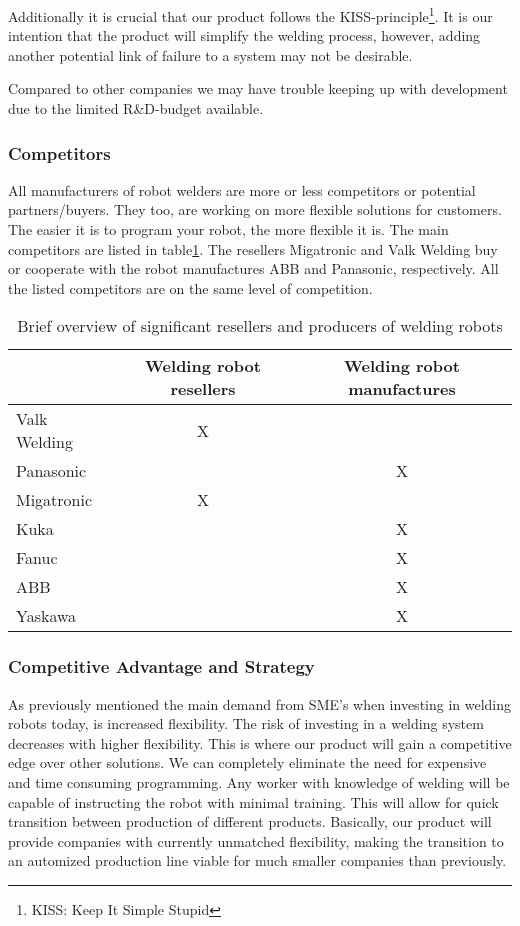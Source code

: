 Additionally it is crucial that our product follows the KISS-principle\footnote{KISS: Keep It Simple Stupid}. It is our intention that the product will simplify the welding process, however, adding another potential link of failure to a system may not be desirable.

Compared to other companies we may have trouble keeping up with development due to the limited R\&D-budget available.
\subsubsection{Competitors}
\label{competitors}
All manufacturers of robot welders are more or less competitors or potential partners/buyers. They too, are working on more flexible solutions for customers. The easier it is to program your robot, the more flexible it is. The main competitors are listed in table\ref{Tablecompetitors}. The resellers Migatronic and Valk Welding buy or cooperate with the robot manufactures ABB and Panasonic, respectively. All the listed competitors are on the same level of competition.

\begin{table}[h]
\centering
\begin{tabular}{|l|c|c|}
\hline
             & Welding robot resellers & Welding robot manufactures \\ 
\hline
Valk Welding & X                       &  \\ 
\hline
Panasonic    &                         & X \\ 
\hline
Migatronic   & X                       &  \\ 
\hline
Kuka         &                         & X \\ 
\hline                                 
Fanuc        &                         & X \\ 
\hline                                 
ABB          &                         & X \\ 
\hline                                 
Yaskawa      &                         & X \\ 
\hline
\end{tabular} 
\caption{Brief overview of significant resellers and producers of welding robots}
\label{Tablecompetitors}
\end{table}

\subsubsection{Competitive Advantage and Strategy}
As previously mentioned the main demand from SME's when investing in welding robots today, is increased flexibility.
 The risk of investing in a welding system decreases with higher flexibility. This is where our product will gain a competitive edge over other solutions. We can completely eliminate the need for expensive and time consuming programming. Any worker with knowledge of welding will be capable of instructing the robot with minimal training. This will allow for quick transition between production of different products. Basically, our product will provide companies with currently unmatched flexibility, making the transition to an automized production line viable for much smaller companies than previously.